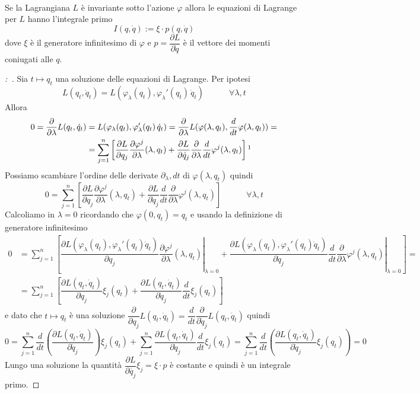 \documentclass[11pt,a4paper,twoside]{book}
\newenvironment{proposizione}[1][\empty]{\begin{Proposizione}{
\ifx\empty#1\relax\else\mdseries\itshape#1\\\fi
}{}}{\end{Proposizione}}
\newenvironment{dimo}[1][\proofname]{
	\begin{tcolorbox}[
	breakable, 
	enhanced, 
	interior hidden, 
	frame hidden, 
	borderline west = {1pt}{0pt}{gray}, 
	top=0pt, bottom=0pt, left=0pt]
\begin{proof}[#1:~]
}
{
\end{proof}
\end{tcolorbox}
}
\theoremstyle{esss}
\theoremstyle{dotless}
\numberwithin{equation}{section} %
\begin{document}
\begin{proposizione}
Se la Lagrangiana $L$ è invariante sotto l'azione $\varphi$ allora le equazioni di Lagrange per $L$ hanno l'integrale primo
\begin{equation}
I(q,\dot{q}):=\xi\cdot p(q,\dot{q})
\end{equation}
dove $\xi$ è il generatore infinitesimo di $\varphi$ e $p=\dfrac{\partial L}{\partial\dot{q}}$ è il vettore dei momenti coniugati alle $q$.
\end{proposizione}
\begin{dimo}
Sia $t\mapsto q_t$ una soluzione delle equazioni di Lagrange. Per ipotesi 
\[
L(q_t,\dot{q}_t)=L(\varphi_\lambda(q_t),\varphi_\lambda'(q_t)\,\dot{q}_t) \qquad \quad \forall \lambda,t
\]
Allora
\begin{align*}
0=\dfrac{\partial}{\partial\lambda}L(q_t,\dot{q}_t)&=L(\varphi_\lambda(q_t),\varphi_\lambda'(q_t)\,\dot{q}_t) = \dfrac{\partial}{\partial \lambda} L(\varphi(\lambda, q_t),\dfrac{d}{d t}\varphi(\lambda, q_t) ) =\\
&=\sum_{j=1}^n\left[\dfrac{\partial L}{\partial q_j}\dfrac{\partial \varphi^j}{\partial \lambda}(\lambda,q_t) + \dfrac{\partial L}{\partial \dot{q}_j} \dfrac{\partial}{\partial \lambda}\dfrac{d}{dt}\varphi^j(\lambda,q_t) \right]\footnotemark[1]
\end{align*}
Possiamo scambiare l'ordine delle derivate $\partial_\lambda, dt$ di $\varphi(\lambda,q_t)$ quindi
\[
0=\sum_{j=1}^n\left[\dfrac{\partial L}{\partial q_j}\dfrac{\partial \varphi^j}{\partial \lambda}(\lambda,q_t) + \dfrac{\partial L}{\partial \dot{q}_j} \dfrac{d}{dt}\dfrac{\partial}{\partial \lambda}\varphi^j(\lambda,q_t) \right] \qquad\quad \forall \lambda,t
\]
Calcoliamo in $\lambda=0$ ricordando che $\varphi(0,q_t)=q_t$ e usando la definizione di generatore infinitesimo  
\begin{align*}
0&=\sum_{j=1}^n\left[ \left. \dfrac{\partial L(\varphi_\lambda(q_t),\varphi_\lambda'(q_t)\dot{q}_t)}{\partial q_j}\dfrac{\partial \varphi^j}{\partial \lambda}(\lambda,q_t)\right|_{\lambda=0} + \left. \dfrac{\partial L(\varphi_\lambda(q_t),\varphi_\lambda'(q_t)\dot{q}_t)}{\partial \dot{q}_j} \dfrac{d}{dt}\dfrac{\partial}{\partial \lambda}\varphi^j(\lambda,q_t)\right|_{\lambda=0} \right] =\\
&=\sum_{j=1}^n\left[ \dfrac{\partial L(q_t,\dot{q}_t)}{\partial q_j}\xi_j(q_t)  +  \dfrac{\partial L(q_t,\dot{q}_t)}{\partial \dot{q}_j} \dfrac{d}{dt}\xi_j(q_t) \right] 
\end{align*}
e dato che $t\mapsto q_t$ è una soluzione $\dfrac{\partial}{\partial q_j}L(q_t,\dot{q}_t)=\dfrac{d}{dt}\dfrac{\partial}{\partial\dot{q}_j}L(q_t,\dot{q}_t)$ quindi
\[
0=\sum_{j=1}^n \dfrac{d}{dt} \left( \dfrac{\partial L(q_t,\dot{q}_t)}{\partial \dot{q}_j}\right)\xi_j(q_t)  + \sum_{j=1}^n \dfrac{\partial L(q_t,\dot{q}_t)}{\partial \dot{q}_j} \dfrac{d}{dt}\xi_j(q_t) =\sum_{j=1}^n \dfrac{d}{dt} \left( \dfrac{\partial L(q_t,\dot{q}_t)}{\partial\dot{q}_j} \xi_j(q_t) \right)=0
\]
Lungo una soluzione la quantità $\dfrac{\partial L}{\partial \dot{q_j}}\xi_j=\xi\cdot p$ è costante e quindi è un integrale primo.\qedhere
\end{dimo}
\end{document}
